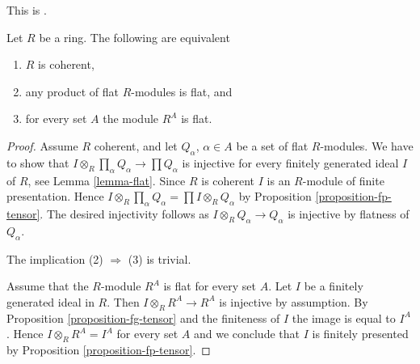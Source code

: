 \begin{proposition}
\label{proposition-characterize-coherent}
\begin{reference}
This is \cite[Theorem 2.1]{Chase}.
\end{reference}
Let $R$ be a ring. The following are equivalent
\begin{enumerate}
\item $R$ is coherent,
\item any product of flat $R$-modules is flat, and
\item for every set $A$ the module $R^A$ is flat.
\end{enumerate}
\end{proposition}

\begin{proof}
Assume $R$ coherent, and let $Q_\alpha$, $\alpha \in A$ be a set of flat
$R$-modules. We have to show that
$I \otimes_R \prod_\alpha Q_\alpha \to \prod Q_\alpha$ is injective
for every finitely generated ideal $I$ of $R$, see
Lemma \ref{lemma-flat}.
Since $R$ is coherent $I$ is an $R$-module of finite presentation.
Hence $I \otimes_R \prod_\alpha Q_\alpha = \prod I \otimes_R Q_\alpha$ by
Proposition \ref{proposition-fp-tensor}.
The desired injectivity follows as $I \otimes_R Q_\alpha \to Q_\alpha$
is injective by flatness of $Q_\alpha$.

\medskip\noindent
The implication (2) $\Rightarrow$ (3) is trivial.

\medskip\noindent
Assume that the $R$-module $R^A$ is flat for every set $A$. Let $I$
be a finitely generated ideal in $R$. Then $I \otimes_R R^A \to R^A$
is injective by assumption. By
Proposition \ref{proposition-fg-tensor}
and the finiteness of $I$ the image is equal to $I^A$. Hence
$I \otimes_R R^A = I^A$ for every set $A$ and we conclude that $I$
is finitely presented by
Proposition \ref{proposition-fp-tensor}.
\end{proof}
